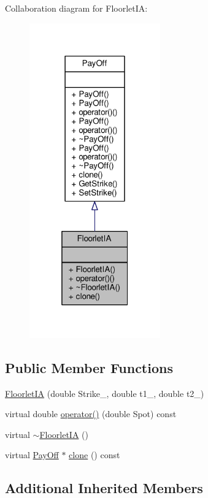 Collaboration diagram for Floorlet\+IA\+:
\nopagebreak
\begin{figure}[H]
\begin{center}
\leavevmode
\includegraphics[width=160pt]{classFloorletIA__coll__graph}
\end{center}
\end{figure}
\subsection*{Public Member Functions}
\begin{DoxyCompactItemize}
\item 
\hyperlink{classFloorletIA_a490751e65075139da8dd97cef885ea5e}{Floorlet\+IA} (double Strike\+\_\+, double t1\+\_\+, double t2\+\_\+)
\item 
virtual double \hyperlink{classFloorletIA_aab8c119bc89c1a1000b5185384cf56bc}{operator()} (double Spot) const
\item 
virtual \hyperlink{classFloorletIA_af6072805d770100c0db4a7b7c4f0b104}{$\sim$\+Floorlet\+IA} ()
\item 
virtual \hyperlink{classPayOff}{Pay\+Off} $\ast$ \hyperlink{classFloorletIA_a8eb08ed3039bb2ef7f5881bcbc8cb85b}{clone} () const
\end{DoxyCompactItemize}
\subsection*{Additional Inherited Members}


